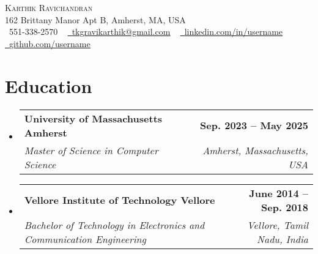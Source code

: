 \documentclass[letterpaper,11pt]{article}
\makeatletter
\newcommand{\resumeSubheading}[4]{
  \vspace{-2pt}\item
    \begin{tabular*}{1.0\textwidth}[t]{l@{\extracolsep{\fill}}r}
      \textbf{#1} & \textbf{\small #2} \\
      \textit{\small#3} & \textit{\small #4} \\
    \end{tabular*}\vspace{-7pt}
}
\newcommand{\resumeSubHeadingListStart}{\begin{itemize}[leftmargin=0.0in, label={}]}
\newcommand{\resumeSubHeadingListEnd}{\end{itemize}}
\makeatother
\begin{document}

\begin{center}
    {\Huge \scshape Karthik Ravichandran} \\ \vspace{1pt}
    162 Brittany Manor Apt B, Amherst, MA, USA \\ \vspace{1pt}
    \small \raisebox{-0.1\height}\faPhone\ 551-338-2570 ~ \href{mailto:x@gmail.com}{\raisebox{-0.2\height}\faEnvelope\  \underline{tkgravikarthik@gmail.com}} ~ 
    \href{https://linkedin.com/in//}{\raisebox{-0.2\height}\faLinkedin\ \underline{linkedin.com/in/username}}  ~
    \href{https://github.com/}{\raisebox{-0.2\height}\faGithub\ \underline{github.com/username}}
    \vspace{-8pt}
\end{center}

\section{Education}
  \resumeSubHeadingListStart
    \resumeSubheading
      {University of Massachusetts  Amherst}{Sep. 2023 -- May 2025}
      {Master of Science in Computer Science}{Amherst, Massachusetts, USA}
  
  \resumeSubheading
  {Vellore Institute of Technology Vellore}{June 2014 -- Sep. 2018}
  {Bachelor of Technology in Electronics and Communication Engineering}{Vellore, Tamil Nadu, India}

  \resumeSubHeadingListEnd
  

\end{document}
